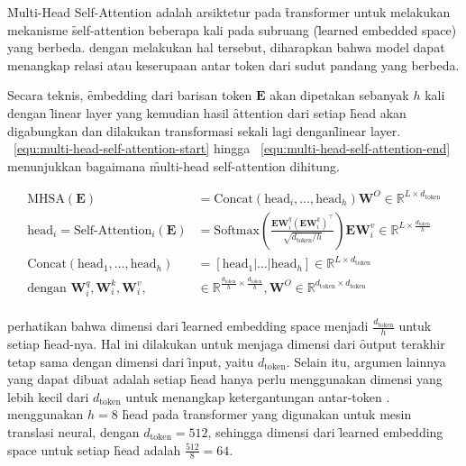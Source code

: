 	\f{Multi-Head Self-Attention} adalah arsiktetur pada \f{transformer} untuk melakukan mekanisme \f{self-attention} beberapa kali pada subruang (\f{learned embedded space}) yang berbeda. dengan melakukan hal tersebut, diharapkan bahwa model dapat menangkap relasi atau keserupaan antar token dari sudut pandang yang berbeda. 

	Secara teknis, \f{embedding} dari barisan token $\mathbf{E}$ akan dipetakan sebanyak $h$ kali dengan \f{linear layer} yang kemudian hasil \f{attention} dari setiap \f{head} akan digabungkan dan dilakukan transformasi sekali lagi dengan\f{linear layer}. \equ~\ref{equ:multi-head-self-attention-start} hingga \equ~\ref{equ:multi-head-self-attention-end} menunjukkan bagaimana \f{multi-head self-attention} dihitung.

	\begin{align}
		\label{equ:multi-head-self-attention-start}
		\text{MHSA}(\mathbf{E}) &= \text{Concat}(\text{head}_i, \dots, \text{head}_h)\mathbf{W}^O \in \mathbb{R}^{L \times d_{\text{token}}} \\
		\text{head}_i = \text{Self-Attention}_i(\mathbf{E}) &= \text{Softmax}(\frac{\mathbf{E} \mathbf{W}^q_i (\mathbf{E} \mathbf{W}^k_i)^{\top}}{\sqrt{d_{\text{token}}/h}}) \mathbf{E} \mathbf{W}^v_i  \in  \mathbb{R}^{L \times \frac{d_{\text{token}}}{h}} \\
		\text{Concat}(\text{head}_1, \dots, \text{head}_h) &= [\text{head}_1 | \dots | \text{head}_h] \in \mathbb{R}^{L \times d_{\text{token}}} \\
		\label{equ:multi-head-self-attention-end}
		\text{dengan } \mathbf{W}^q_i, \mathbf{W}^k_i, \mathbf{W}^v_i,&\in \mathbb{R}^{\frac{d_{\text{token}}}{h} \times \frac{d_{\text{token}}}{h}}, \mathbf{W}^O \in \mathbb{R}^{d_{\text{token}} \times d_{\text{token}}} \\	
	\end{align}

	perhatikan bahwa dimensi dari \f{learned embedding space} menjadi $\frac{d_{\text{token}}}{h}$ untuk setiap \f{head}-nya. Hal ini dilakukan untuk menjaga dimensi dari \f{output} terakhir tetap sama dengan dimensi dari \f{input}, yaitu $d_{\text{token}}$. Selain itu, argumen lainnya yang dapat dibuat adalah setiap \f{head} hanya perlu menggunakan dimensi yang lebih kecil dari $d_{\text{token}}$ untuk menangkap ketergantungan antar-token \citep{pi-tau2023transformer}. \cite{transformerori} menggunakan $h=8$ \f{head} pada \f{transformer} yang digunakan untuk mesin translasi neural, dengan $d_{\text{token}} = 512$, sehingga dimensi dari \f{learned embedding space} untuk setiap \f{head} adalah $\frac{512}{8} = 64$.

